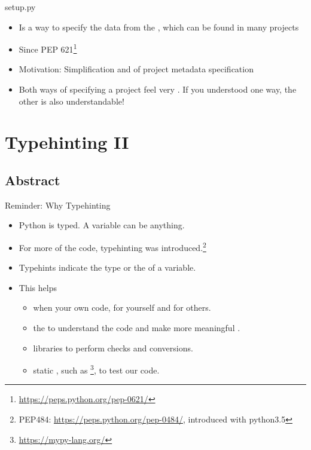 \documentclass[12pt, aspectratio=169, usepdftitle=false]{beamer}
\newcommand{\pp}[1]{\lpl{#1}}
\newcommand{\furl}[1]{\footnote{\url{#1}}}
\begin{document}
\begin{frame}{setup.py}
	\begin{itemize}
		\item Is a  way to specify the data from the , which can be found in many projects
		\item Since PEP 621\furl{https://peps.python.org/pep-0621/} 
		\item[] Motivation: Simplification and  of project metadata specification
		\item Both ways of specifying a project feel very . If you understood one way, the other is also understandable!
	\end{itemize}	
\end{frame}

{}


\section{Typehinting II}
\subsection{Abstract}
\begin{frame}{Reminder: Why Typehinting}
	\begin{itemize}
		\item Python is  typed. A variable can be anything.
		\item For more  of the code, typehinting was introduced.\footnote{PEP484: \url{https://peps.python.org/pep-0484/}, introduced with python3.5}
		\item Typehints indicate the  type or the  of a variable.
		\item[] This helps
		\begin{itemize}
			\item when  your own code, for yourself and for others.
			\item the  to understand the code and make more meaningful .
			\item libraries to perform  checks and conversions.
			\item static , such as \pp{mypy}\furl{https://mypy-lang.org/}, to test our code.
		\end{itemize}
	\end{itemize}	
\end{frame}
\end{document}
